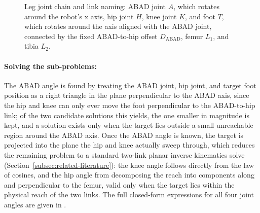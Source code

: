 \documentclass[12pt]{article}
\begin{document}
\begin{figure}[htbp]
    \centering
    \caption{Leg joint chain and link naming: ABAD joint $A$, which rotates around the robot's x axis, hip joint $H$, knee joint $K$, and foot $T$, which rotates around the axis aligned with the ABAD joint, connected by the fixed ABAD-to-hip offset $D_{\text{ABAD}}$, femur $L_1$, and tibia $L_2$.}
    \label{fig:leg_geometry}
\end{figure}

\paragraph{Solving the sub-problems:} The ABAD angle is found by treating the ABAD joint, hip joint, and target foot position as a right triangle in the plane perpendicular to the ABAD axis, since the hip and knee can only ever move the foot perpendicular to the ABAD-to-hip link; of the two candidate solutions this yields, the one smaller in magnitude is kept, and a solution exists only when the target lies outside a small unreachable region around the ABAD axis. Once the ABAD angle is known, the target is projected into the plane the hip and knee actually sweep through, which reduces the remaining problem to a standard two-link planar inverse kinematics solve (Section~\ref{subsec:related-literature}): the knee angle follows directly from the law of cosines, and the hip angle from decomposing the reach into components along and perpendicular to the femur, valid only when the target lies within the physical reach of the two links. The full closed-form expressions for all four joint angles are given in .
\end{document}
